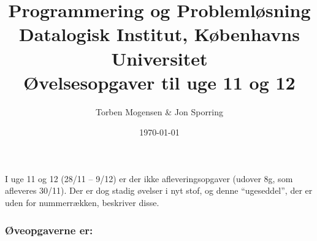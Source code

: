 \documentclass[a4paper]{article}
\begin{document}
\title{Programmering og Problemløsning\\
Datalogisk Institut, Københavns Universitet\\
Øvelsesopgaver til uge 11 og 12}

\author{Torben Mogensen \& Jon Sporring}
\date{\today}

\maketitle

\noindent
I uge 11 og 12 (28/11 -- 9/12) er der ikke afleveringsopgaver (udover
8g, som afleveres 30/11).  Der er dog stadig øvelser i nyt stof, og
denne ``ugeseddel'', der er uden for nummerrækken, beskriver disse.

\subsubsection*{Øveopgaverne er:}
\end{document}
